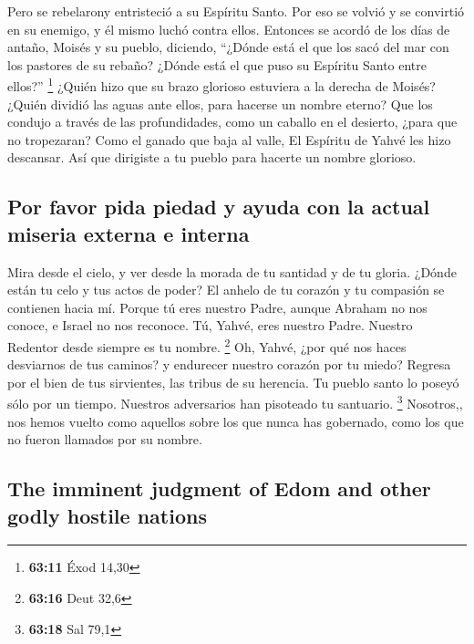 \begin{paracol}{2}
 Pero se rebelarony entristeció a su Espíritu Santo. Por
eso se volvió y se convirtió en su enemigo, y él mismo luchó contra
ellos.  Entonces se acordó de los días de antaño, Moisés
y su pueblo, diciendo, ``¿Dónde está el que los sacó del mar con los
pastores de su rebaño? ¿Dónde está el que puso su Espíritu Santo entre
ellos?'' \footnote{\textbf{63:11} Éxod 14,30}  ¿Quién
hizo que su brazo glorioso estuviera a la derecha de Moisés? ¿Quién
dividió las aguas ante ellos, para hacerse un nombre eterno?
 Que los condujo a través de las profundidades, como un
caballo en el desierto, ¿para que no tropezaran?  Como el
ganado que baja al valle, El Espíritu de Yahvé les hizo descansar. Así
que dirigiste a tu pueblo para hacerte un nombre glorioso.

\hypertarget{por-favor-pida-piedad-y-ayuda-con-la-actual-miseria-externa-e-interna}{%
\subsection{Por favor pida piedad y ayuda con la actual miseria externa
e
interna}\label{por-favor-pida-piedad-y-ayuda-con-la-actual-miseria-externa-e-interna}}

 Mira desde el cielo, y ver desde la morada de tu
santidad y de tu gloria. ¿Dónde están tu celo y tus actos de poder? El
anhelo de tu corazón y tu compasión se contienen hacia mí.
 Porque tú eres nuestro Padre, aunque Abraham no nos
conoce, e Israel no nos reconoce. Tú, Yahvé, eres nuestro Padre. Nuestro
Redentor desde siempre es tu nombre. \footnote{\textbf{63:16} Deut 32,6}
 Oh, Yahvé, ¿por qué nos haces desviarnos de tus caminos?
y endurecer nuestro corazón por tu miedo? Regresa por el bien de tus
sirvientes, las tribus de su herencia.  Tu pueblo santo
lo poseyó sólo por un tiempo. Nuestros adversarios han pisoteado tu
santuario. \footnote{\textbf{63:18} Sal 79,1}  Nosotros,,
nos hemos vuelto como aquellos sobre los que nunca has gobernado, como
los que no fueron llamados por su nombre.

\switchcolumn
\begin{otherlanguage}{english}

\hypertarget{the-imminent-judgment-of-edom-and-other-godly-hostile-nations}{%
\subsection{The imminent judgment of Edom and other godly hostile
nations}\label{the-imminent-judgment-of-edom-and-other-godly-hostile-nations}}


\end{otherlanguage}
\end{paracol}
